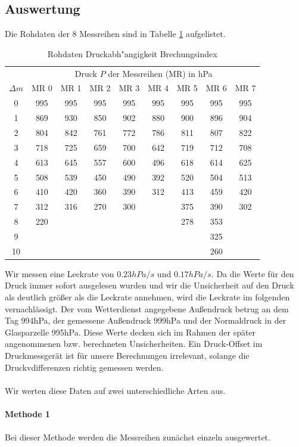 \documentclass[12pt,a4paper]{article}
\begin{document}
\subsection{Auswertung}
Die Rohdaten der 8 Messreihen sind in Tabelle \ref{table:RohdatenDruck} aufgelistet.
\begin{table}[H]
	\centering
	\begin{tabular}{|c|c|c|c|c|c|c|c|c|}
		\hline
		&\multicolumn{8}{c|}{Druck $P$ der Messreihen (MR) in hPa}\\
		$\Delta m$&MR 0&MR 1&MR 2&MR 3&MR 4&MR 5&MR 6&MR 7\\
		\hline
		0&995&995&995&995&995&995&995&995\\
		1&869&930&850&902&880&900&896&904\\
		2&804&842&761&772&786&811&807&822\\
		3&718&725&659&700&642&719&712&708\\
		4&613&645&557&600&496&618&614&625\\
		5&508&539&450&490&392&520&504&513\\
		6&410&420&360&390&312&413&459&420\\
		7&312&316&270&300&&375&390&302\\
		8&220&&&&&278&353&\\
		9&&&&&&&325&\\
		10&&&&&&&260&\\
		\hline
	\end{tabular}
	\caption{Rohdaten Druckabh"angigkeit Brechungsindex}
	\label{table:RohdatenDruck}
\end{table}
Wir messen eine Leckrate von $0.23hPa/s$ und $0.17hPa/s$. Da die Werte für den Druck immer sofort ausgelesen wurden und wir die Unsicherheit auf den Druck als deutlich größer als die Leckrate annehmen, wird die Leckrate im folgenden vernachlässigt. Der vom Wetterdienst angegebene Außendruck betrug an dem Tag 994hPa, der gemessene Außendruck 999hPa und der Normaldruck in der Glasparzelle 995hPa. Diese Werte decken sich im Rahmen der später angenommenen bzw. berechneten Unsicherheiten. Ein Druck-Offset im Druckmessgerät ist für unsere Berechnungen irrelevant, solange die Druckvdifferenzen richtig gemessen werden.\\
\\
Wir werten diese Daten auf zwei unterschiedliche Arten aus.\\
\\
\textbf{Methode 1}\\
\\
Bei dieser Methode werden die Messreihen zunächst einzeln ausgewertet.\\
\end{document}
